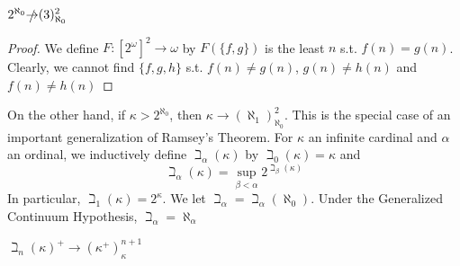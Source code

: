 \documentclass[11pt]{article}
\begin{document}
\begin{proposition}[]
\(2^{\aleph_0}\slashed{\to}(3)^2_{\aleph_0}\)
\end{proposition}

\begin{proof}
We define \(F:[2^\omega]^2\to\omega\) by \(F(\{f,g\})\) is the least \(n\) s.t. \(f(n)=g(n)\). Clearly, we
cannot find \(\{f,g,h\}\) s.t. \(f(n)\neq g(n)\), \(g(n)\neq h(n)\) and \(f(n)\neq h(n)\)
\end{proof}

On the other hand, if \(\kappa>2^{\aleph_0}\), then \(\kappa\to(\aleph_1)_{\aleph_0}^2\). This is the special case of an
important generalization of Ramsey's Theorem. For \(\kappa\) an infinite cardinal and \(\alpha\) an ordinal, we
inductively define \(\beth_\alpha(\kappa)\) by \(\beth_0(\kappa)=\kappa\) and
\begin{equation*}
\beth_\alpha(\kappa)=\sup_{\beta<\alpha}2^{\beth_\beta(\kappa)}
\end{equation*}
In particular, \(\beth_1(\kappa)=2^\kappa\). We let \(\beth_\alpha=\beth_\alpha(\aleph_0)\). Under the Generalized Continuum
Hypothesis, \(\beth_\alpha=\aleph_\alpha\)

\begin{theorem}
\(\beth_n(\kappa)^+\to(\kappa^+)_\kappa^{n+1}\)
\end{theorem}
\end{document}

